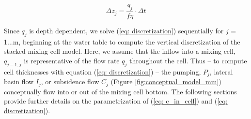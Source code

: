 \begin{equation}
\Delta z_j =  \frac{q_j}{f \eta}  \cdot  \Delta t
\label{eq: discretization}
\end{equation}

Since $q_j$ is depth dependent, we solve (\ref{eq: discretization}) sequentially for $j$ = 1...m, beginning at the water table to compute the vertical discretization of the stacked mixing cell model. Here, we assume that the inflow into a mixing cell, $q_{j-1, j}$ is representative of the flow rate $q_j$ throughout the cell. Thus -- to compute cell thicknesses with equation (\ref{eq: discretization}) -- the pumping, $P_j$, lateral basin flow $I_j$, or subsidence flow $C_j$ (Figure \ref{fig:conceptual_model_mm}) conceptually flow into or out of the mixing cell bottom. The following sections provide further details on the parametrization of (\ref{eq: c_in_cell}) and (\ref{eq: discretization}).

